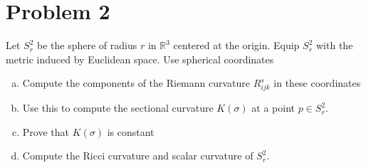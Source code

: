 \documentclass[a4paper]{article}
\begin{document}
\section*{Problem 2}%
Let $S_r^2$ be the sphere of radius $r$ in $\mathds{R}^3$ centered at the origin. Equip $S_r^2$ with the metric induced by Euclidean space. Use spherical coordinates
\begin{enumerate}[(a)]
  \item  Compute the components of the Riemann curvature $R_{ijk}^s$ in these coordinates
  \item Use this to compute the sectional curvature $K(\sigma)$ at a point $p \in S_r^2$.
  \item Prove that $K(\sigma)$ is constant
  \item Compute the Ricci curvature and scalar curvature of $S_r^2$.
\end{enumerate}
\end{document}

